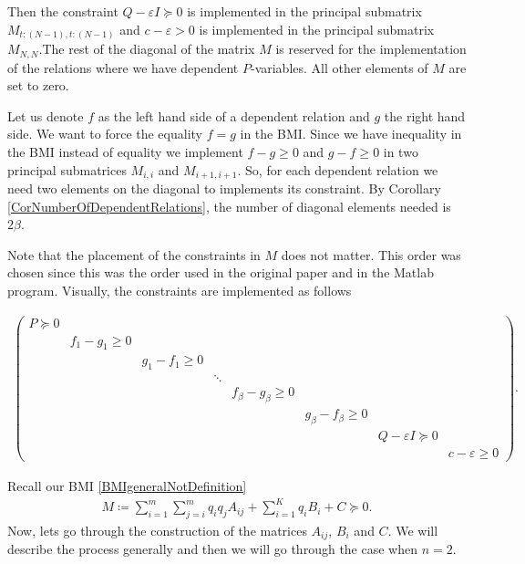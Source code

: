 \documentclass[a4paper,12pt,twoside,BCOR=10mm]{scrbook}
\begin{document}
Then the constraint $Q - \varepsilon I\succeq 0$ is implemented in the principal submatrix \textsc{$M_{t:(N-1), t:(N-1)}$} and $c - \varepsilon > 0$ is implemented in the principal submatrix $M_{N,N}$.The rest of the diagonal of the matrix $M$ is reserved for the implementation of the relations where we have dependent $P$-variables. All other elements of $M$ are set to zero.

Let us denote $f$ as the left hand side of a dependent relation and $g$ the right hand side. We want to force the equality $f = g$ in the BMI. Since we have inequality in the BMI instead of equality we implement $f - g \geq 0$ and $g - f \geq 0$ in two principal submatrices $M_{i,i}$ and $M_{i+1,i+1}$. So, for each dependent relation we need two elements on the diagonal to implements its constraint. By Corollary \ref{CorNumberOfDependentRelations}, the number of diagonal elements needed is $2\beta$.

Note that the placement of the constraints in $M$ does not matter. This order was chosen since this was the order used in the original paper \citep{Ha2019BMI} and in the Matlab program. Visually, the constraints are implemented as follows

\footnotesize{
\begin{align*}
    \begin{pmatrix}
    P \succeq 0 & & & & & & &\\
      & f_1 - g_1 \geq 0 & & & & & &\\
      & & g_1 - f_1 \geq 0 & & & & &\\
      & & & \ddots & & & &\\
      & & & & f_\beta - g_\beta \geq 0 & & &\\
      & & & & & g_\beta - f_\beta \geq 0 & &\\
      & & & & & & Q - \varepsilon I \succeq 0 &\\
      & & & & & & & c - \varepsilon \geq 0
    \end{pmatrix}.
\end{align*}
}

Recall our BMI \eqref{BMIgeneralNotDefinition}
\begin{align*}
    M \coloneqq \sum\limits_{i = 1}^m \sum\limits_{j = i}^m q_iq_j A_{ij} + \sum\limits_{i = 1}^K q_iB_i + C \succeq 0.
\end{align*}
Now, lets go through the construction of the matrices $A_{ij}$, $B_i$ and $C$. We will describe the process generally and then we will go through the case when $n = 2$.
\end{document}
